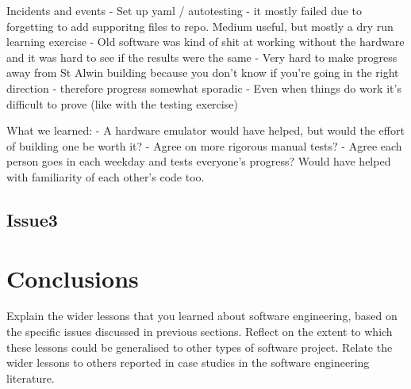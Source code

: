 \documentclass{l3proj}
\begin{document}
Incidents and events
- Set up yaml / autotesting - it mostly failed due to forgetting to add supporitng files to repo. Medium useful, but mostly a dry run learning exercise
- Old software was kind of shit at working without the hardware and it was hard to see if the results were the same
- Very hard to make progress away from St Alwin building because you don't know if you're going in the right direction - therefore progress somewhat sporadic
- Even when things do work it's difficult to prove (like with the testing exercise)

What we learned:
- A hardware emulator would have helped, but would the effort of building one be worth it?
- Agree on more rigorous manual tests?
- Agree each person goes in each weekday and tests everyone's progress? Would have helped with familiarity of each other's code too.

\subsection{Issue3}


\section{Conclusions}
Explain the wider lessons that you learned about software engineering,
based on the specific issues discussed in previous sections.  Reflect
on the extent to which these lessons could be generalised to other
types of software project.  Relate the wider lessons to others
reported in case studies in the software engineering literature.

%
%
\printbibliography
\end{document}
